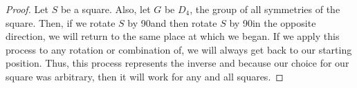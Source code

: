 \documentclass[executivepaper]{article}
\begin{document}
\begin{flushleft}
\begin{center}
\begin{proof}

Let $S$ be a square. Also, let $G$ be $D_{4}$, the group of all symmetries of the square. Then, if we rotate $S$ by 90\degree and then rotate $S$ by 90\degree in the opposite direction, we will return to the same place at which we began. If we apply this process to any rotation or combination of, we will always get back to our starting position. Thus, this process represents the inverse and because our choice for our square was arbitrary, then it will work for any and all squares.

\end{proof}

\end{center}

\end{flushleft}
\end{document}
